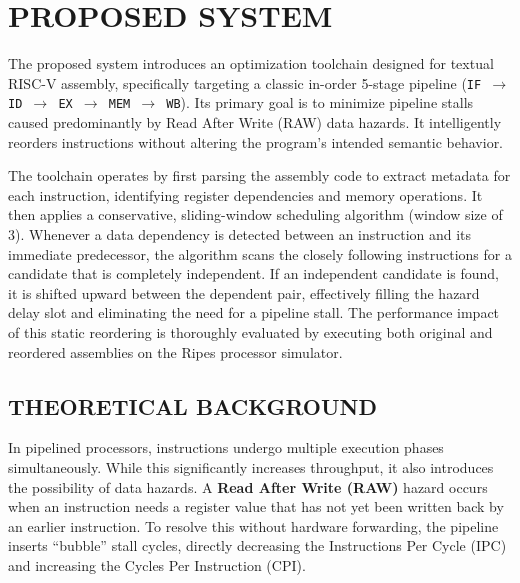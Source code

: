 \documentclass[11pt]{report}
\begin{document}

\newpage
\chapter{PROPOSED SYSTEM}

The proposed system introduces an optimization toolchain designed for textual RISC-V assembly, specifically targeting a classic in-order 5-stage pipeline (\texttt{IF $\rightarrow$ ID $\rightarrow$ EX $\rightarrow$ MEM $\rightarrow$ WB}). Its primary goal is to minimize pipeline stalls caused predominantly by Read After Write (RAW) data hazards. It intelligently reorders instructions without altering the program's intended semantic behavior.

The toolchain operates by first parsing the assembly code to extract metadata for each instruction, identifying register dependencies and memory operations. It then applies a conservative, sliding-window scheduling algorithm (window size of 3). Whenever a data dependency is detected between an instruction and its immediate predecessor, the algorithm scans the closely following instructions for a candidate that is completely independent. If an independent candidate is found, it is shifted upward between the dependent pair, effectively filling the hazard delay slot and eliminating the need for a pipeline stall. The performance impact of this static reordering is thoroughly evaluated by executing both original and reordered assemblies on the Ripes processor simulator.

\noindent
\vspace{-1 cm}
\noindent

\section{THEORETICAL BACKGROUND}

In pipelined processors, instructions undergo multiple execution phases simultaneously. While this significantly increases throughput, it also introduces the possibility of data hazards. A \textbf{Read After Write (RAW)} hazard occurs when an instruction needs a register value that has not yet been written back by an earlier instruction. To resolve this without hardware forwarding, the pipeline inserts ``bubble'' stall cycles, directly decreasing the Instructions Per Cycle (IPC) and increasing the Cycles Per Instruction (CPI).
\end{document}
